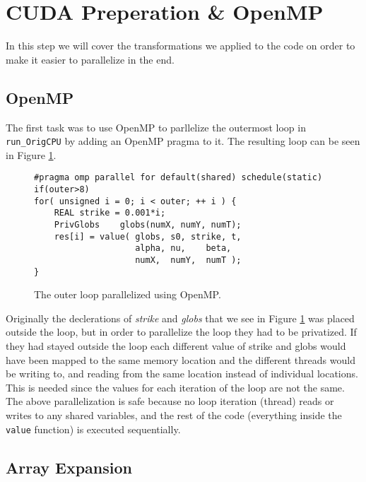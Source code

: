 \section{CUDA Preperation \& OpenMP}

In this step we will cover the transformations we applied to the code on order
to make it easier to parallelize in the end. 

\subsection{OpenMP}
The first task was to use OpenMP to parllelize the outermost loop in
\texttt{run\_OrigCPU} by adding an OpenMP pragma to it. The resulting loop can
be seen in Figure \ref{code:openmp1}.

\begin{figure}[H]
    \begin{lstlisting}
#pragma omp parallel for default(shared) schedule(static) if(outer>8)
for( unsigned i = 0; i < outer; ++ i ) {
    REAL strike = 0.001*i;
    PrivGlobs    globs(numX, numY, numT);
    res[i] = value( globs, s0, strike, t,
                    alpha, nu,    beta,
                    numX,  numY,  numT );
}
    \end{lstlisting}
    \caption{The outer loop parallelized using OpenMP.}
    \label{code:openmp1}
\end{figure}

Originally the declerations of \textit{strike} and \textit{globs} that we see in
Figure \ref{code:openmp1} was placed outside the loop, but in order to
parallelize the loop they had to be privatized. If they had stayed outside the
loop each different value of strike and globs would have been mapped to the same
memory location and the different threads would be writing to, and reading from
the same location instead of individual locations. This is needed since the
values for each iteration of the loop are not the same. The above
parallelization is safe because no loop iteration (thread) reads or writes to
any shared variables, and the rest of the code (everything inside the
\texttt{value} function) is executed sequentially.

\subsection{Array Expansion}

